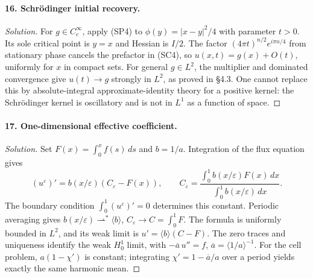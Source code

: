 \Needspace{30mm}
\paragraph{16. Schr\"odinger initial recovery.}
\begin{proof}[Solution]
For $g\in C_c^\infty$, apply (SP4) to
$\phi(y)=|x-y|^2/4$ with parameter $t>0$.
Its sole critical point is $y=x$ and Hessian is $I/2$.
The factor $(4\pi t)^{n/2}e^{i\pi n/4}$ from stationary phase
cancels the prefactor in (SC4), so $u(x,t)=g(x)+O(t)$,
uniformly for $x$ in compact sets.
For general $g\in L^2$, the multiplier and dominated convergence give
$u(t)\to g$ strongly in $L^2$, as proved in \S4.3.
One cannot replace this by absolute-integral approximate-identity
theory for a positive kernel: the Schr\"odinger kernel is oscillatory
and is not in $L^1$ as a function of space.
\end{proof}

\Needspace{30mm}
\paragraph{17. One-dimensional effective coefficient.}
\begin{proof}[Solution]
Set $F(x)=\int_0^xf(s)\,ds$ and $b=1/a$.
Integration of the flux equation gives
\[
 (u^\varepsilon)'=b(x/\varepsilon)(C_\varepsilon-F(x)),\qquad
 C_\varepsilon=
 \frac{\int_0^1b(x/\varepsilon)F(x)\,dx}
      {\int_0^1b(x/\varepsilon)\,dx}.
\]
The boundary condition $\int_0^1(u^\varepsilon)'=0$
determines this constant.
Periodic averaging gives $b(x/\varepsilon)\rightharpoonup^*\langle b\rangle$,
$C_\varepsilon\to C=\int_0^1F$.
The formula is uniformly bounded in $L^2$, and its weak limit is
$u'=\langle b\rangle(C-F)$.
The zero traces and uniqueness identify the weak $H_0^1$ limit, with
$-\overline a\,u''=f$, $\overline a=\langle1/a\rangle^{-1}$.
For the cell problem, $a(1-\chi')$ is constant;
integrating $\chi'=1-\overline a/a$ over a period yields exactly
the same harmonic mean.
\end{proof}

\Needspace{30mm}
